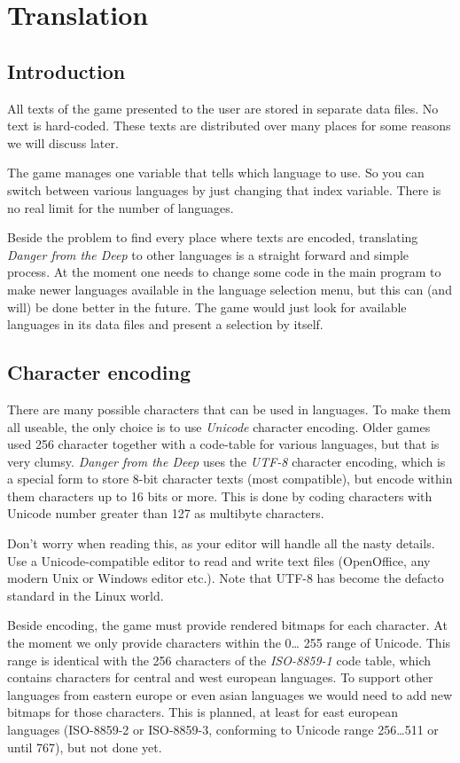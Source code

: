 \documentclass[a4paper,12pt]{report}
\begin{document}
\tableofcontents

\chapter{Translation}

\section{Introduction}

All texts of the game presented to the user are stored in separate data
files. No text is hard-coded. These texts are distributed over many
places for some reasons we will discuss later.

The game manages one variable that tells which language to use. So you
can switch between various languages by just changing that index
variable. There is no real limit for the number of languages.

Beside the problem to find every place where texts are encoded,
translating \emph{Danger from the Deep} to other languages is a straight
forward and simple process. At the moment one needs to change some code
in the main program to make newer languages available in the language
selection menu, but this can (and will) be done better in the future.
The game would just look for available languages in its data files and
present a selection by itself.

\section{Character encoding}

There are many possible characters that can be used in languages. To
make them all useable, the only choice is to use \emph{Unicode}
character encoding. Older games used 256 character together with a
code-table for various languages, but that is very clumsy. \emph{Danger
  from the Deep} uses the \emph{UTF-8} character encoding, which is a
special form to store 8-bit character texts (most compatible), but
encode within them characters up to 16 bits or more. This is done by
coding characters with Unicode number greater than 127 as multibyte
characters.

Don't worry when reading this, as your editor will handle all the nasty
details. Use a Unicode-compatible editor to read and write text files
(OpenOffice, any modern Unix or Windows editor etc.). Note that UTF-8
has become the defacto standard in the Linux world.

Beside encoding, the game must provide rendered bitmaps for each
character. At the moment we only provide characters within the 0\ldots
255 range of Unicode. This range is identical with the 256 characters of
the \emph{ISO-8859-1} code table, which contains characters for central
and west european languages. To support other languages from eastern
europe or even asian languages we would need to add new bitmaps for
those characters. This is planned, at least for east european languages
(ISO-8859-2 or ISO-8859-3, conforming to Unicode range 256\ldots511 or
until 767), but not done yet.
\end{document}
